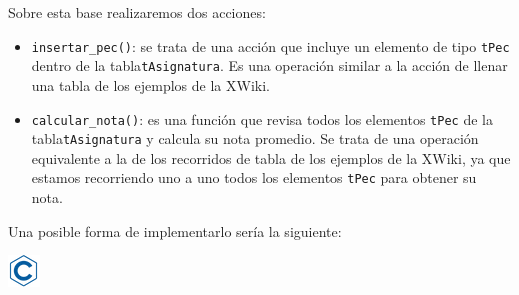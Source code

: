 \documentclass[
]{book}
\providecommand{\tightlist}{%
  \setlength{\itemsep}{0pt}\setlength{\parskip}{0pt}}
\begin{document}
Sobre esta base realizaremos dos acciones:

\begin{itemize}
\tightlist
\item
  \texttt{insertar\_pec()}: se trata de una acción que incluye un elemento de tipo \texttt{tPec} dentro de la tabla\texttt{tAsignatura}. Es una operación similar a la acción de llenar una tabla de los ejemplos de la XWiki.
\item
  \texttt{calcular\_nota()}: es una función que revisa todos los elementos \texttt{tPec} de la tabla\texttt{tAsignatura} y calcula su nota promedio. Se trata de una operación equivalente a la de los recorridos de tabla de los ejemplos de la XWiki, ya que estamos recorriendo uno a uno todos los elementos \texttt{tPec} para obtener su nota.
\end{itemize}

Una posible forma de implementarlo sería la siguiente:

\includegraphics{./img/c.png}
\end{document}
